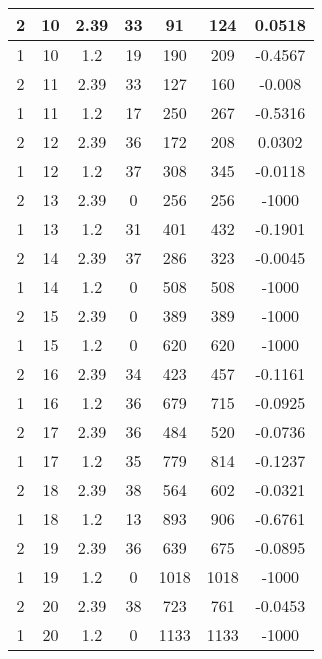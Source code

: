 \documentclass[letterpaper, 12pt]{article}
\begin{document}
\begin{longtable}{|c|c|c|c|c|c|c|}
\hline
2 & 10 & 2.39 & 33 & 91 & 124 & 0.0518 \\
\hline
1 & 10 & 1.2 & 19 & 190 & 209 & -0.4567 \\
\hline
2 & 11 & 2.39 & 33 & 127 & 160 & -0.008 \\
\hline
1 & 11 & 1.2 & 17 & 250 & 267 & -0.5316 \\
\hline
2 & 12 & 2.39 & 36 & 172 & 208 & 0.0302 \\
\hline
1 & 12 & 1.2 & 37 & 308 & 345 & -0.0118 \\
\hline
2 & 13 & 2.39 & 0 & 256 & 256 & -1000 \\
\hline
1 & 13 & 1.2 & 31 & 401 & 432 & -0.1901 \\
\hline
2 & 14 & 2.39 & 37 & 286 & 323 & -0.0045 \\
\hline
1 & 14 & 1.2 & 0 & 508 & 508 & -1000 \\
\hline
2 & 15 & 2.39 & 0 & 389 & 389 & -1000 \\
\hline
1 & 15 & 1.2 & 0 & 620 & 620 & -1000 \\
\hline
2 & 16 & 2.39 & 34 & 423 & 457 & -0.1161 \\
\hline
1 & 16 & 1.2 & 36 & 679 & 715 & -0.0925 \\
\hline
2 & 17 & 2.39 & 36 & 484 & 520 & -0.0736 \\
\hline
1 & 17 & 1.2 & 35 & 779 & 814 & -0.1237 \\
\hline
2 & 18 & 2.39 & 38 & 564 & 602 & -0.0321 \\
\hline
1 & 18 & 1.2 & 13 & 893 & 906 & -0.6761 \\
\hline
2 & 19 & 2.39 & 36 & 639 & 675 & -0.0895 \\
\hline
1 & 19 & 1.2 & 0 & 1018 & 1018 & -1000 \\
\hline
2 & 20 & 2.39 & 38 & 723 & 761 & -0.0453 \\
\hline
1 & 20 & 1.2 & 0 & 1133 & 1133 & -1000 \\
\hline
\end{longtable}
\end{document}
